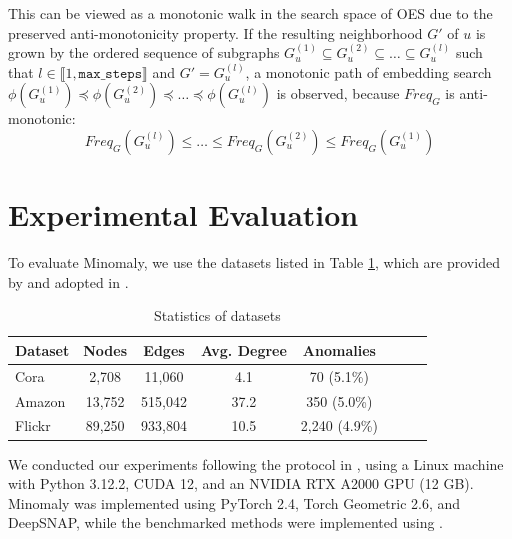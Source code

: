 \documentclass[pdflatex,sn-mathphys-num]{sn-jnl}%
\theoremstyle{thmstyleone}%
\theoremstyle{thmstyletwo}%
\theoremstyle{thmstylethree}%
\begin{document}
This can be viewed as a monotonic walk in the search space of OES due to the preserved anti-monotonicity property. If the resulting neighborhood $G'$ of $u$ is grown by the ordered sequence of subgraphs $G^{(1)}_u \subseteq G^{(2)}_u \subseteq \dots \subseteq G^{(l)}_u$ such that $l \in \llbracket 1, \texttt{max\_steps} \rrbracket$ and $G' = G^{(l)}_u$, a monotonic path of embedding search $\phi(G^{(1)}_u) \preceq \phi(G^{(2)}_u) \preceq \dots \preceq \phi(G^{(l)}_u)$ is observed, because $Freq_G$ is anti-monotonic: \[Freq_G(G^{(l)}_u) \le \dots \le Freq_G(G^{(2)}_u) \le Freq_G(G^{(1)}_u)\]

\section{Experimental Evaluation}
\label{sec:eval}
To evaluate Minomaly, we use the datasets listed in Table \ref{tab:datasets}, which are provided by \cite{NEURIPS2022-acc1ec4a,JMLR:v25:23-0963} and adopted in \cite{chen2020generative,ding2019deep,fan2020anomalydae,gu2024three,yuan2024higherorder}. %

\begin{table}
\centering
\vspace*{-20pt}
\caption{Statistics of datasets}
\label{tab:datasets}
\scriptsize
\begin{tabular}{lccccccc}
\toprule
Dataset       & Nodes  & Edges   & Avg. Degree & Anomalies \\
\midrule
Cora     & 2,708  & 11,060  & 4.1         & 70 (5.1\%)    \\
Amazon   & 13,752 & 515,042 & 37.2        & 350 (5.0\%)    \\
Flickr   & 89,250 & 933,804 & 10.5        & 2,240 (4.9\%)    \\
\bottomrule
\end{tabular}
\end{table}

We conducted our experiments following the protocol in \cite{NEURIPS2022-acc1ec4a}, using a Linux machine with Python 3.12.2, CUDA 12, and an NVIDIA RTX A2000 GPU (12 GB). Minomaly was implemented using PyTorch 2.4, Torch Geometric 2.6, and DeepSNAP, while the benchmarked methods were implemented using \cite{JMLR:v25:23-0963}.
\end{document}
